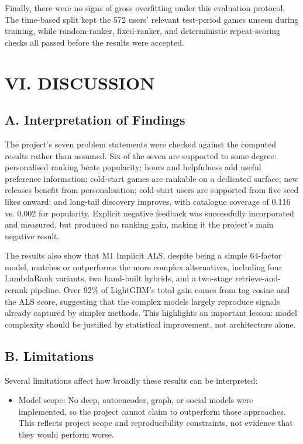 \documentclass[conference]{IEEEtran}
\begin{document}
Finally, there were no signs of gross overfitting under this evaluation protocol. The time-based split kept the 572 users' relevant test-period games unseen during training, while random-ranker, fixed-ranker, and deterministic repeat-scoring checks all passed before the results were accepted.

\section*{VI. DISCUSSION}

\subsection*{A. Interpretation of Findings}

The project's seven problem statements were checked against the computed results rather than assumed. Six of the seven are supported to some degree: personalised ranking beats popularity; hours and helpfulness add useful preference information; cold-start games are rankable on a dedicated surface; new releases benefit from personalisation; cold-start users are supported from five seed likes onward; and long-tail discovery improves, with catalogue coverage of 0.116 vs. 0.002 for popularity. Explicit negative feedback was successfully incorporated and measured, but produced no ranking gain, making it the project's main negative result.

The results also show that M1 Implicit ALS, despite being a simple 64-factor model, matches or outperforms the more complex alternatives, including four LambdaRank variants, two hand-built hybrids, and a two-stage retrieve-and-rerank pipeline. Over 92\% of LightGBM's total gain comes from tag cosine and the ALS score, suggesting that the complex models largely reproduce signals already captured by simpler methods. This highlights an important lesson: model complexity should be justified by statistical improvement, not architecture alone.

\subsection*{B. Limitations}

Several limitations affect how broadly these results can be interpreted:

\begin{itemize}

\item Model scope: No deep, autoencoder, graph, or social models were implemented, so the project cannot claim to outperform those approaches. This reflects project scope and reproducibility constraints, not evidence that they would perform worse.

\end{itemize}
\end{document}

